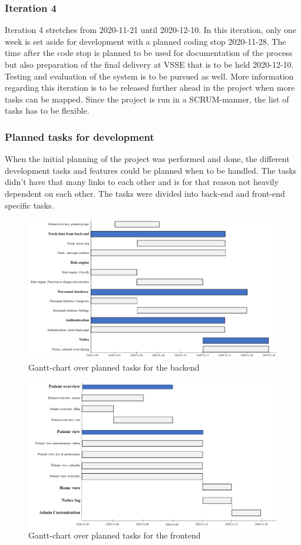 \subsubsection{Iteration 4}
Iteration 4 stretches from 2020-11-21 until 2020-12-10. In this iteration, only one week is set aside for development with a planned coding stop 2020-11-28. The time after the code stop is planned to be used for documentation of the process but also preparation of the final delivery at VSSE that is to be held 2020-12-10. Testing and evaluation of the system is to be pursued as well. \vspace{5mm}
More information regarding this iteration is to be released further ahead in the project when more tasks can be mapped. Since the project is run in a SCRUM-manner, the list of tasks has to be flexible. 
\subsubsection{Planned tasks for development}
When the initial planning of the project was performed and done, the different development tasks and features could be planned when to be handled. The tasks didn't have that many links to each other and is for that reason not heavily dependent on each other. The tasks were divided into back-end and front-end specific tasks.
\begin{figure}[hbt!]
\centering
\includegraphics[width=\linewidth]{Pictures/DevTasksBackend.PNG}
\caption{Gantt-chart over planned tasks for the backend}
\label{fig:backend}
\end{figure}
\begin{figure}[hbt!]
\centering
\includegraphics[width=\linewidth]{Pictures/DevTasksFrontend.PNG}
\caption{Gantt-chart over planned tasks for the frontend}
\label{fig:fronten}
\end{figure}

